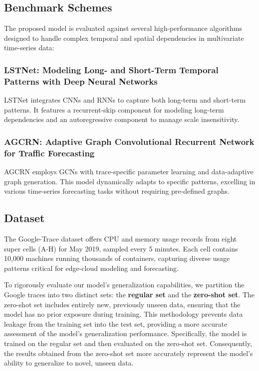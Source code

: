 \documentclass{ieeetmlcn}
\begin{document}
\subsection{Benchmark Schemes}

The proposed model is evaluated against several high-performance algorithms designed to handle complex temporal and spatial dependencies in multivariate time-series data:

\subsubsection*{\textbf{LSTNet: Modeling Long- and Short-Term Temporal Patterns with Deep Neural Networks \cite{LSTNet}}}
LSTNet integrates CNNs and RNNs to capture both long-term and short-term patterns. It features a recurrent-skip component for modeling long-term dependencies and an autoregressive component to manage scale insensitivity.

\subsubsection*{\textbf{AGCRN: Adaptive Graph Convolutional Recurrent Network for Traffic Forecasting \cite{AGCRN}}}
AGCRN employs GCNs with trace-specific parameter learning and data-adaptive graph generation. This model dynamically adapts to specific patterns, excelling in various time-series forecasting tasks without requiring pre-defined graphs.


\subsection{Dataset}
\label{sec:Dataset}

The Google-Trace dataset \cite{google2019cluster} offers CPU and memory usage records from eight super cells (A-H) for May 2019, sampled every 5 minutes. Each cell contains 10,000 machines running thousands of containers, capturing diverse usage patterns critical for edge-cloud modeling and forecasting.

To rigorously evaluate our model's generalization capabilities, we partition the Google traces into two distinct sets: the \textbf{regular set} and the \textbf{zero-shot set}. The zero-shot set includes entirely new, previously unseen data, ensuring that the model has no prior exposure during training. This methodology prevents data leakage from the training set into the test set, providing a more accurate assessment of the model's generalization performance. Specifically, the model is trained on the regular set and then evaluated on the zero-shot set. Consequently, the results obtained from the zero-shot set more accurately represent the model's ability to generalize to novel, unseen data.
\end{document}

